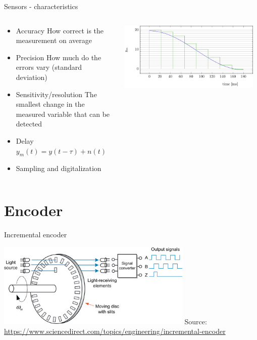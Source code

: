 \documentclass[presentation,aspectratio=169]{beamer}
\begin{document}
\begin{frame}[label={sec:org193c061}]{Sensors - characteristics}
\begin{columns}
\begin{column}{0.4\columnwidth}
\begin{itemize}
\item \alert{Accuracy} How correct is the measurement on average
\item \alert{Precision} How much do the errors vary (standard deviation)
\item \alert{Sensitivity/resolution} The smallest change in the measured variable that can be detected
\item \alert{Delay} \(y_m(t) = y(t-\tau) + n(t)\)
\item \alert{Sampling and digitalization}
\end{itemize}
\end{column}

\begin{column}{0.6\columnwidth}
\pause

\begin{center}
\includegraphics[width=0.96\textwidth]{../../figures/sampling-digitalization}
\end{center}
\end{column}
\end{columns}
\end{frame}

\section{Encoder}
\label{sec:org2dadea7}
\begin{frame}[label={sec:orgabf93e3}]{Incremental encoder}
\begin{center}
\includegraphics[width=0.7\textwidth]{../../figures/encoder-im.jpg}
{\tiny Source: \url{https://www.sciencedirect.com/topics/engineering/incremental-encoder}}
\end{center}
\end{frame}
\end{document}
